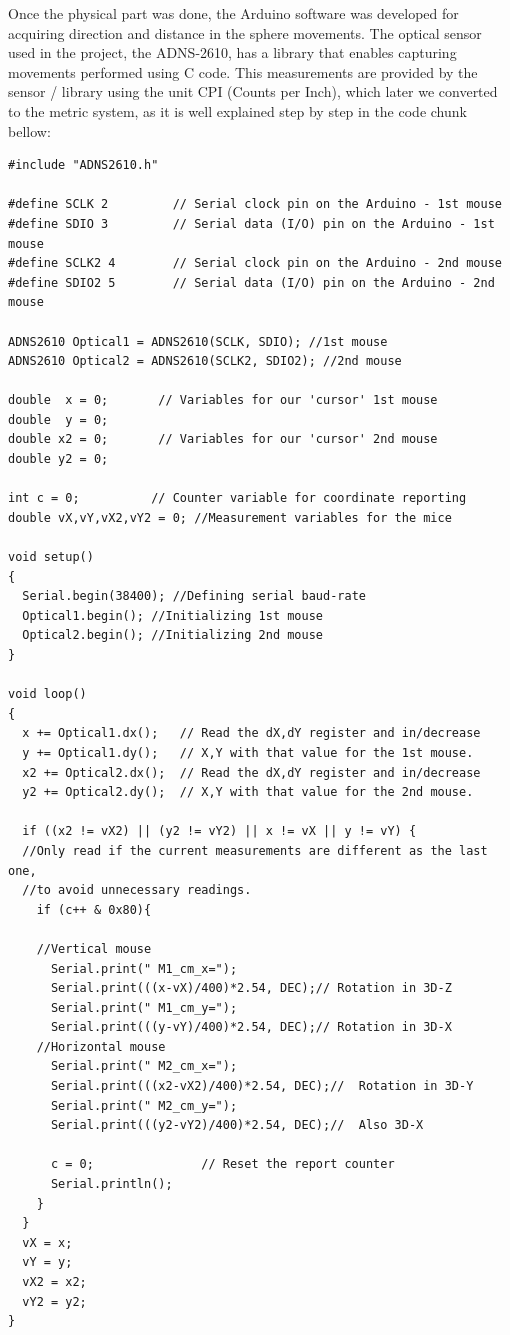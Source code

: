 \documentclass[12pt]{article}
\begin{document}
Once the physical part was done, the Arduino software was developed for acquiring direction and distance in the sphere movements. The optical sensor used in the project, the ADNS-2610, has a library \cite{martijn} that enables capturing movements performed using C code. This measurements are provided by the sensor / library using the unit CPI (Counts per Inch), which later we converted to the metric system, as it is well explained step by step in the code chunk bellow: 
\\
{
\scriptsize
\begin{verbatim}
#include "ADNS2610.h"

#define SCLK 2         // Serial clock pin on the Arduino - 1st mouse
#define SDIO 3         // Serial data (I/O) pin on the Arduino - 1st mouse
#define SCLK2 4        // Serial clock pin on the Arduino - 2nd mouse
#define SDIO2 5        // Serial data (I/O) pin on the Arduino - 2nd mouse

ADNS2610 Optical1 = ADNS2610(SCLK, SDIO); //1st mouse
ADNS2610 Optical2 = ADNS2610(SCLK2, SDIO2); //2nd mouse

double  x = 0;       // Variables for our 'cursor' 1st mouse
double  y = 0;       
double x2 = 0;       // Variables for our 'cursor' 2nd mouse
double y2 = 0;                        

int c = 0;          // Counter variable for coordinate reporting
double vX,vY,vX2,vY2 = 0; //Measurement variables for the mice

void setup()
{
  Serial.begin(38400); //Defining serial baud-rate
  Optical1.begin(); //Initializing 1st mouse                       
  Optical2.begin(); //Initializing 2nd mouse                    
}

void loop()
{
  x += Optical1.dx();   // Read the dX,dY register and in/decrease
  y += Optical1.dy();   // X,Y with that value for the 1st mouse.
  x2 += Optical2.dx();  // Read the dX,dY register and in/decrease
  y2 += Optical2.dy();  // X,Y with that value for the 2nd mouse.

  if ((x2 != vX2) || (y2 != vY2) || x != vX || y != vY) {
  //Only read if the current measurements are different as the last one,
  //to avoid unnecessary readings.
    if (c++ & 0x80){

    //Vertical mouse
      Serial.print(" M1_cm_x=");
      Serial.print(((x-vX)/400)*2.54, DEC);// Rotation in 3D-Z
      Serial.print(" M1_cm_y=");
      Serial.print(((y-vY)/400)*2.54, DEC);// Rotation in 3D-X
    //Horizontal mouse
      Serial.print(" M2_cm_x=");
      Serial.print(((x2-vX2)/400)*2.54, DEC);//  Rotation in 3D-Y
      Serial.print(" M2_cm_y=");
      Serial.print(((y2-vY2)/400)*2.54, DEC);//  Also 3D-X 

      c = 0;               // Reset the report counter
      Serial.println();     
    }
  }
  vX = x;
  vY = y;
  vX2 = x2;
  vY2 = y2;
}
\end{verbatim}
}
\end{document}
